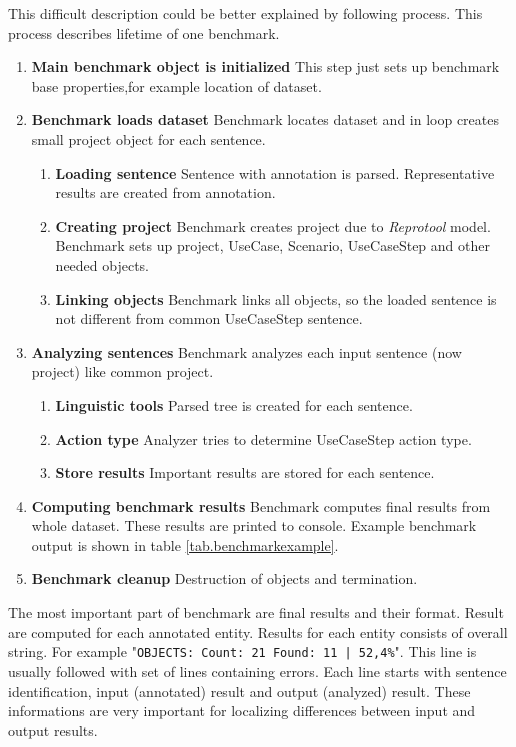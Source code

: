 This difficult description could be better explained by following process. This process describes lifetime of one benchmark.

\begin{enumerate}
\item {\bf Main benchmark object is initialized} This step just sets up benchmark base properties,for example location of dataset.

\item {\bf Benchmark loads dataset} Benchmark locates dataset and in loop creates small project object for each sentence.
    \begin{enumerate}
    \item {\bf Loading sentence} Sentence with annotation is parsed. Representative results are created from annotation.
    \item {\bf Creating project} Benchmark creates project due to \emph{Reprotool} model. Benchmark sets up project, UseCase, Scenario, UseCaseStep and other needed objects.
    \item {\bf Linking objects} Benchmark links all objects, so the loaded sentence is not different from common UseCaseStep sentence.
    \end{enumerate}

\item {\bf Analyzing sentences} Benchmark analyzes each input sentence (now project)  like common project.
    \begin{enumerate}
    \item {\bf Linguistic tools} Parsed tree is created for each sentence.
    \item {\bf Action type} Analyzer tries to determine UseCaseStep action type.
    \item {\bf Store results} Important results are stored for each sentence.
    \end{enumerate}
\item {\bf Computing benchmark results} Benchmark computes final results from whole dataset. These results are printed to console. Example benchmark output is shown in table \ref{tab.benchmarkexample}.
\item {\bf Benchmark cleanup} Destruction of objects and termination.
\end{enumerate}

The most important part of benchmark are final results and their format. Result are computed for each annotated entity. Results for each entity consists of overall string. For example "{\tt OBJECTS: Count: 21 Found: 11 | 52,4\%}". This line is usually followed with set of lines containing errors. Each line starts with sentence identification, input (annotated) result and  output (analyzed) result. These informations are very important for localizing differences between input and output results.


